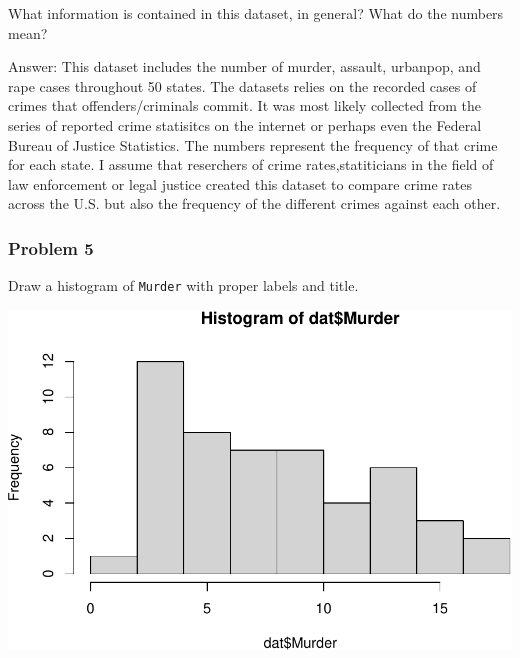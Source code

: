 \documentclass[
]{article}
\newenvironment{Shaded}{\begin{snugshade}}{\end{snugshade}}
\newcommand{\AttributeTok}[1]{\textcolor[rgb]{0.77,0.63,0.00}{#1}}
\newcommand{\FunctionTok}[1]{\textcolor[rgb]{0.00,0.00,0.00}{#1}}
\newcommand{\NormalTok}[1]{#1}
\newcommand{\SpecialCharTok}[1]{\textcolor[rgb]{0.00,0.00,0.00}{#1}}
\newcommand{\StringTok}[1]{\textcolor[rgb]{0.31,0.60,0.02}{#1}}
\begin{document}
What information is contained in this dataset, in general? What do the
numbers mean?

Answer: This dataset includes the number of murder, assault, urbanpop,
and rape cases throughout 50 states. The datasets relies on the recorded
cases of crimes that offenders/criminals commit. It was most likely
collected from the series of reported crime statisitcs on the internet
or perhaps even the Federal Bureau of Justice Statistics. The numbers
represent the frequency of that crime for each state. I assume that
reserchers of crime rates,statiticians in the field of law enforcement
or legal justice created this dataset to compare crime rates across the
U.S. but also the frequency of the different crimes against each other.

\hypertarget{problem-5}{%
\subsubsection{Problem 5}\label{problem-5}}

Draw a histogram of \texttt{Murder} with proper labels and title.

\begin{Shaded}
\end{Shaded}

\includegraphics{Assignments_files/figure-latex/unnamed-chunk-6-1.pdf}
\end{document}
